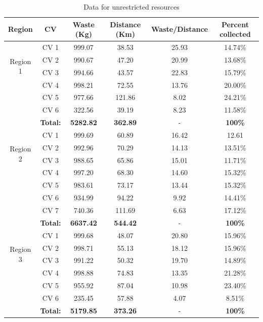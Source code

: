 \documentclass[12pt]{article}
\begin{document}
\begin{table}[H]
    \centering
    \caption{ Data for unrestricted resources} \label{tab3}
    \vspace*{0.3cm}
    \begin{tabular}{|c|c|c|c|c|c|}
        \hline Region & CV & Waste (Kg) & Distance (Km) & Waste/Distance & Percent collected \\
        \hline \multirow{4}{*}{Region 1} & CV 1 & 999.07& 38.53 & 25.93 &14.74\% \\
        \cline{2-6}& CV 2 & 990.67 & 47.20 & 20.99 & 13.68\%\\        
        \cline{2-6}& CV 3 & 994.66 & 43.57 & 22.83 & 15.79\%\\        
        \cline{2-6}& CV 4 & 998.21 & 72.55 & 13.76 & 20.00\%\\      
        \cline{2-6}& CV 5 & 977.66 & 121.86 & 8.02 & 24.21\%\\      
        \cline{2-6}& CV 6 & 322.56 & 39.19 & 8.23 & 11.58\%\\ 
        \hline &\textbf{Total:} &\textbf{5282.82} &\textbf{362.89} &- &\textbf{100\%}\\
        \hline \multirow{4}{*}{Region 2} & CV 1 & 999.69 & 60.89 & 16.42 & 12.61 \\
        \cline{2-6}& CV 2 & 992.96 & 70.29 & 14.13 & 13.51\%\\        
        \cline{2-6}& CV 3 & 988.65 & 65.86 & 15.01 & 11.71\%\\        
        \cline{2-6}& CV 4 & 997.20 & 68.30 & 14.60 & 15.32\%\\      
        \cline{2-6}& CV 5 & 983.61 & 73.17 & 13.44 & 15.32\%\\      
        \cline{2-6}& CV 6 & 934.99 & 94.22 & 9.92 & 14.41\%\\      
        \cline{2-6}& CV 7 & 740.36 & 111.69 & 6.63 & 17.12\%\\
        \hline &\textbf{Total:} &\textbf{6637.42} &\textbf{544.42} &- &\textbf{100\%}\\     
        \hline \multirow{4}{*}{Region 3} & CV 1 & 999.68 & 48.07 & 20.80 & 15.96\% \\
		\cline{2-6}& CV 2 & 998.71 & 55.13 & 18.12 & 15.96\%\\        
		\cline{2-6}& CV 3 & 991.22 & 50.32 & 19.70 & 14.89\%\\        
		\cline{2-6}& CV 4 & 998.88 & 74.83 & 13.35 & 21.28\%\\      
		\cline{2-6}& CV 5 & 955.92 & 87.04 & 10.98 & 23.40\%\\      
		\cline{2-6}& CV 6 & 235.45 & 57.88 & 4.07 & 8.51\%\\ 
        \hline &\textbf{Total:} &\textbf{5179.85} &\textbf{373.26 }&- &\textbf{100\%}\\
        \hline      
    \end{tabular}
\end{table}
\end{document}
